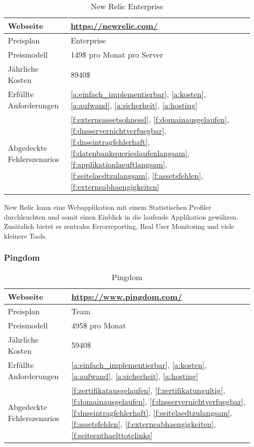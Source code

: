 \begin{table}[h!]
  \centering
  \begin{tabular}{p{5cm} p{7cm}}
  \toprule
    Webseite & \url{https://newrelic.com/}\\
  \hline
    Preisplan & Enterprise\\
  \hline
    Preismodell & 149\$ pro Monat pro Server\\
  \hline
    Jährliche Kosten & 8940\$\\
  \hline
    Erfüllte Anforderungen & \ref{a:einfach_implementierbar}, \ref{a:kosten}, \ref{a:aufwand}, \ref{a:sicherheit}, \ref{a:hosting}\\
  \hline
    Abgedeckte Fehlerszenarios & \ref{f:externeassetsohnessl}, \ref{f:domainausgelaufen}, \ref{f:dnsservernichtverfuegbar}, \ref{f:dnseintragfehlerhaft}, \ref{f:datenbankquerieslaufenlangsam}, \ref{f:applikationlaeuftlangsam}, \ref{f:seitelaedtzulangsam}, \ref{f:assetsfehlen}, \ref{f:externeabhaengigkeiten}\\
  \bottomrule
  \end{tabular}
  \caption{New Relic Enterprise}
  \label{tab:new_relic_enterprise}
\end{table}

New Relic kann eine Webapplikation mit einem Statistischen Profiler durchleuchten und somit einen Einblick in die laufende Applikation gewähren. Zusätzlich bietet es zentrales Errorreporting, Real User Monitoring und viele kleinere Tools.

\subsubsection{Pingdom}
\label{ssub:pingdom}

\begin{table}[h!]
  \centering
  \begin{tabular}{p{5cm} p{7cm}}
  \toprule
    Webseite & \url{https://www.pingdom.com/}\\
  \hline
    Preisplan & Team\\
  \hline
    Preismodell & 495\$ pro Monat\\
  \hline
    Jährliche Kosten & 5940\$\\
  \hline
    Erfüllte Anforderungen & \ref{a:einfach_implementierbar}, \ref{a:kosten}, \ref{a:aufwand}, \ref{a:sicherheit}, \ref{a:hosting}\\
  \hline
    Abgedeckte Fehlerszenarios & \ref{f:zertifikatausgelaufen}, \ref{f:zertifikatungultig}, \ref{f:domainausgelaufen}, \ref{f:dnsservernichtverfuegbar}, \ref{f:dnseintragfehlerhaft}, \ref{f:seitelaedtzulangsam}, \ref{f:assetsfehlen}, \ref{f:externeabhaengigkeiten}, \ref{f:seiteenthaelttotelinks}\\
  \bottomrule
  \end{tabular}
  \caption{Pingdom}
  \label{tab:pingdom}
\end{table}

